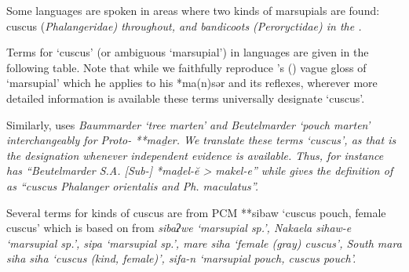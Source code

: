 Some  languages are spoken in areas where two
kinds of marsupials are found: cuscus (\it{Phalangeridae}) throughout,
and bandicoots (\it{Peroryctidae}) in the .

Terms for ‘cuscus’ (or ambiguous ‘marsupial’) in 
languages are given in the following table.
Note that while we faithfully reproduce
\citeauthor{Collins1983}'s (\citeyear{Collins1983})
vague gloss of `marsupial' which he applies to his *ma(n)sər and its reflexes,
wherever more detailed information is
available these terms universally designate `cuscus'.

Similarly, \citet{Stresemann1927} uses
\it{Baummarder} `tree marten' and \it{Beutelmarder} `pouch marten'
interchangeably for Proto- **maḏer.
We translate these terms `cuscus', as that is the designation
whenever independent evidence is available.
Thus, for instance \citet[41]{Stresemann1927} has
``Beutelmarder S.A. [Sub-] *maḏel-ĕ >  \it{makel-e}''
while \citet[130]{Stresemann1918} gives the definition of 
as ``cuscus \it{Phalanger orientalis} and \it{Ph. maculatus}''.

Several terms for kinds of cuscus are from PCM **sibaw
‘cuscus pouch, female cuscus’ which is based on from  \it{sibaʔwe} ‘marsupial sp.’,
Naka{\Q}ela \it{sihaw-e} ‘marsupial sp.’,
 \it{sipa} ‘marsupial sp.’,
 \it{mare siha} ‘female (gray) cuscus’,
South  \it{mara siha {\tl} siha} ‘cuscus (kind,
female)’,  \it{sifa-n} ‘marsupial pouch,
cuscus pouch’.

